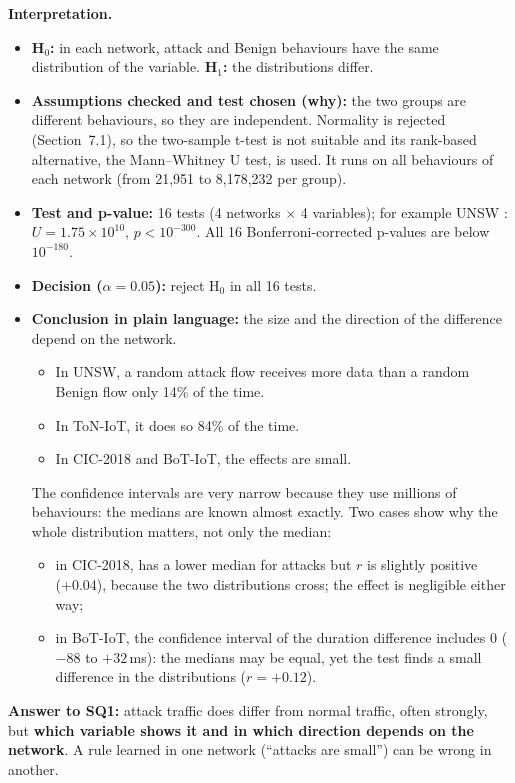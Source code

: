 \documentclass[11pt,a4paper]{article}
\newcommand{\var}[1]{\texttt{\detokenize{#1}}}
\newenvironment{reading}{\par\smallskip\noindent\textbf{\color{navy}Interpretation.}\ }{\par\medskip}
\begin{document}
\begin{reading}
\begin{itemize}
  \item \textbf{H$_0$:} in each network, attack and Benign behaviours have the same distribution of the variable.
        \textbf{H$_1$:} the distributions differ.
  \item \textbf{Assumptions checked and test chosen (why):} the two groups are different behaviours, so they are
        independent. Normality is rejected (Section~7.1), so the two-sample t-test is not suitable and its rank-based
        alternative, the Mann--Whitney U test, is used. It runs on all behaviours of each network (from 21,951 to
        8,178,232 per group).
  \item \textbf{Test and p-value:} 16 tests (4 networks $\times$ 4 variables); for example UNSW \var{OUT_BYTES}:
        $U = 1.75\times10^{10}$, $p < 10^{-300}$. All 16 Bonferroni-corrected p-values are below $10^{-180}$.
  \item \textbf{Decision ($\alpha = 0.05$):} reject H$_0$ in all 16 tests.
  \item \textbf{Conclusion in plain language:} the size and the direction of the difference depend on the network.
        \begin{itemize}
          \item In UNSW, a random attack flow receives more data than a random Benign flow only 14\% of the time.
          \item In ToN-IoT, it does so 84\% of the time.
          \item In CIC-2018 and BoT-IoT, the effects are small.
        \end{itemize}
        The confidence intervals are very narrow because they use millions of behaviours: the medians are known almost
        exactly. Two cases show why the whole distribution matters, not only the median:
        \begin{itemize}
          \item in CIC-2018, \var{OUT_BYTES} has a lower median for attacks but $r$ is slightly positive (+0.04),
                because the two distributions cross; the effect is negligible either way;
          \item in BoT-IoT, the confidence interval of the duration difference includes 0 ($-88$ to $+32$\,ms): the
                medians may be equal, yet the test finds a small difference in the distributions ($r = +0.12$).
        \end{itemize}
\end{itemize}
\textbf{Answer to SQ1:} attack traffic does differ from normal traffic, often strongly, but \textbf{which variable shows
it and in which direction depends on the network}. A rule learned in one network (``attacks are small'') can be wrong
in another.
\end{reading}
\end{document}

